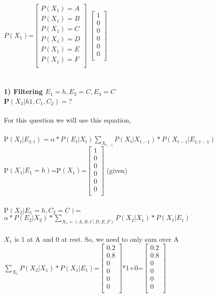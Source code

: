 \documentclass[11pt,a4paper]{article}
\begin{document}
$P(X_{1})$=$\begin{bmatrix}
P(X_{1})=A\\
P(X_{1})=B\\
P(X_{1})=C\\
P(X_{1})=D\\
P(X_{1})=E\\
P(X_{1})=F\\
\end{bmatrix}$
$\begin{bmatrix}
1\\
0\\
0\\
0\\
0\\
0\\
\end{bmatrix}$\\\\\\
\newpage
\textbf{1) Filtering $E_{1}=h, E_{2}=C, E_{3}=C$  \\ P$(X_{3}|h{1},C_{1}, C_{2})=?$}\\\\
For this question we will use this equation,\\\\
P$(X_{t}|E_{1:t})=\alpha*P(E_{t}|X_{t}) \sum_{X_{t-1}}P(X_{t}|X_{t-1})*P(X_{t-1}|E_{1:t-1})$\\
P$(X_{1}|E_{1}=h)$=P$(X_{1})$=$\begin{bmatrix}
1\\
0\\
0\\
0\\
0\\
0\\
\end{bmatrix}$ (given)\\\\
P$(X_{2}|E_{1}=h, C_{2}=C)$=$\alpha*P(E_{2}|X_{2})*\sum_{X_{1}=(A,B,C,D,E,F)}P(X_{2}|X_{1})*P(X_{1}|E_{1})$\\\\
$X_{1}$ is 1 at A and 0 at rest. So, we need to only sum over A\\
$\sum_{X_{1}}P(X_{2}|X_{1})*P(X_{1}|E_{1})$=$\begin{bmatrix}
0.2\\
0.8\\
0\\
0\\
0\\
0\\
\end{bmatrix}$*1+0=$\begin{bmatrix}
0.2\\
0.8\\
0\\
0\\
0\\
0\\
\end{bmatrix}$\\\\\\
\end{document}
